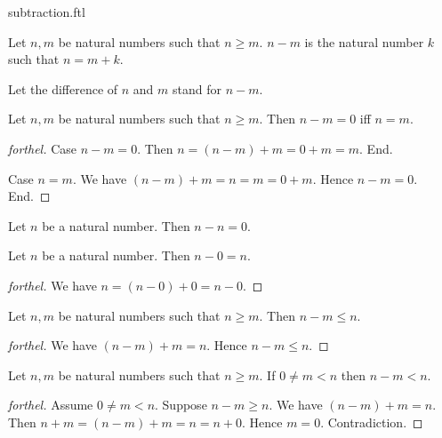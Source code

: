 \documentclass{naproche-library}
\begin{document}
\begin{smodule}[title=Subtraction]{subtraction.ftl}

\begin{definition}[forthel,id=ARITHMETIC_05_8878757276286976]
  Let $n, m$ be natural numbers such that $n \geq m$.
  $n - m$ is the natural number $k$ such that $n = m + k$.

  Let the difference of $n$ and $m$ stand for $n - m$.
\end{definition}

\begin{proposition}[forthel,id=ARITHMETIC_05_874271710642176]
  Let $n, m$ be natural numbers such that $n \geq m$.
  Then $n - m = 0$ iff $n = m$.
\end{proposition}
\begin{proof}[forthel]
  Case $n - m = 0$.
    Then $n
      = (n - m) + m
      = 0 + m
      = m$.
  End.

  Case $n = m$.
    We have $(n - m) + m
      = n
      = m
      = 0 + m$.
    Hence $n - m = 0$.
  End.
\end{proof}

\begin{corollary}[forthel,id=ARITHMETIC_05_8457713057005568]
  Let $n$ be a natural number.
  Then $n - n = 0$.
\end{corollary}

\begin{proposition}[forthel,id=ARITHMETIC_05_8518521570983936]
  Let $n$ be a natural number.
  Then $n - 0 = n$.
\end{proposition}
\begin{proof}[forthel]
  We have $n
    = (n - 0) + 0
    = n - 0$.
\end{proof}

\begin{proposition}[forthel,id=ARITHMETIC_05_4222566117933056]
  Let $n, m$ be natural numbers such that $n \geq m$.
  Then $n - m \leq n$.
\end{proposition}
\begin{proof}[forthel]
  We have $(n - m) + m = n$.
  Hence $n - m \leq n$.
\end{proof}

\begin{proposition}[forthel,id=ARITHMETIC_05_1269537257291776]
  Let $n, m$ be natural numbers such that $n \geq m$.
  If $0 \neq m < n$ then $n - m < n$.
\end{proposition}
\begin{proof}[forthel]
  Assume $0 \neq m < n$.
  Suppose $n - m \geq n$.
  We have $(n - m) + m = n$.
  Then $n + m
    = (n - m) + m
    = n
    = n + 0$.
  Hence $m = 0$.
  Contradiction.
\end{proof}


\end{smodule}
\end{document}
